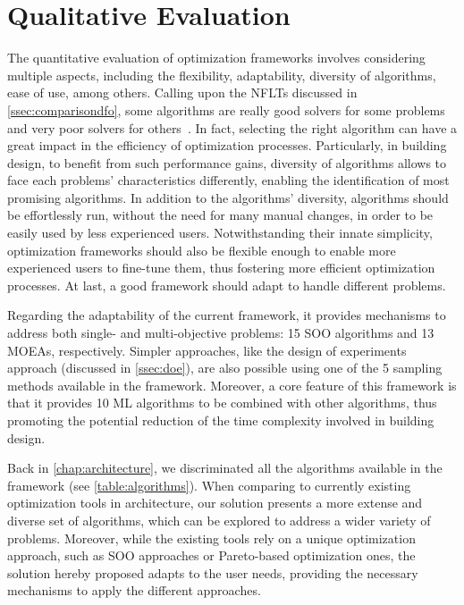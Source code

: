\section{Qualitative Evaluation}
\label{sec:qualitative}

The quantitative evaluation of optimization frameworks involves considering multiple aspects, including the flexibility, adaptability, diversity of algorithms, ease of use, among others. Calling upon the \acp{NFLT} discussed in \cref{ssec:comparisondfo}, some algorithms are really good solvers for some problems and very poor solvers for others~\cite{Wolpert1997NFLT}. In fact, selecting the right algorithm can have a great impact in the efficiency of optimization processes. Particularly, in building design, to benefit from such performance gains, diversity of algorithms allows to face each problems' characteristics differently, enabling the identification of most promising algorithms. In addition to the algorithms' diversity, algorithms should be effortlessly run, without the need for many manual changes, in order to be easily used by less experienced users. Notwithstanding their innate simplicity, optimization frameworks should also be flexible enough to enable more experienced users to fine-tune them, thus fostering more efficient optimization processes. At last, a good framework should adapt to handle different problems.

Regarding the adaptability of the current framework, it provides mechanisms to address both single- and multi-objective problems: 15 \ac{SOO} algorithms and 13 \acp{MOEA}, respectively. Simpler approaches, like the design of experiments approach (discussed in \cref{ssec:doe}), are also possible using one of the 5 sampling methods available in the framework. Moreover, a core feature of this framework is that it provides 10 \ac{ML} algorithms to be combined with other algorithms, thus  promoting the potential reduction of the time complexity involved in building design. 

Back in \cref{chap:architecture}, we discriminated all the algorithms available in the framework (see \cref{table:algorithms}). When comparing to currently existing optimization tools in architecture, our solution presents a more extense and diverse set of algorithms, which can be explored to address a wider variety of problems. Moreover, while the existing tools rely on a unique optimization approach, such as \ac{SOO} approaches or Pareto-based optimization ones, the solution hereby proposed adapts to the user needs, providing the necessary mechanisms to apply the different approaches.


